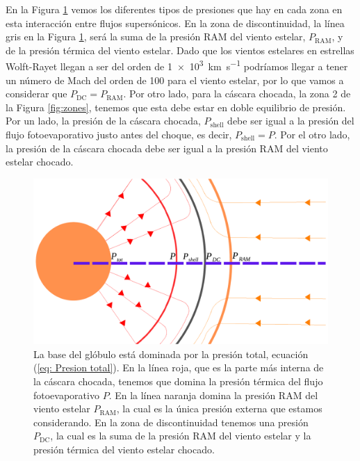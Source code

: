 \documentclass{book}
\begin{document}
En la Figura \ref{fig:zones_presiones} vemos los diferentes tipos de presiones que hay en cada zona en esta interacción entre flujos supersónicos. En la zona de discontinuidad, la línea gris en la Figura \ref{fig:zones_presiones}, será la suma de la presión RAM del viento estelar, $P_\mathrm{RAM}$, y de la presión térmica del viento estelar. Dado que los vientos estelares en estrellas Wolft-Rayet llegan a ser del orden de \SI{1e3}{km.s^{-1}} podríamos llegar a tener un número de Mach del orden de 100 para el viento estelar, por lo que vamos a considerar que $P_\mathrm{DC}=P_\mathrm{RAM}$. Por otro lado, para la cáscara chocada, la zona 2 de la Figura \ref{fig:zones}, tenemos que esta debe estar en doble equilibrio de presión. Por un lado, la presión de la cáscara chocada, $P_\mathrm{shell}$ debe ser igual a la presión del flujo fotoevaporativo justo antes del choque, es decir, $P_\mathrm{shell}=P$. Por el otro lado, la presión de la cáscara chocada debe ser igual a la presión RAM del viento estelar chocado.

\begin{figure}[htb]
    \centering    \includegraphics[width=\textwidth]{imagenes_corregidas/Arreglo 03.pdf}
    \caption{La base del glóbulo está dominada por la presión total, ecuación (\ref{eq: Presion total}). En la línea roja, que es la parte más interna de la cáscara chocada, tenemos que domina la presión térmica del flujo fotoevaporativo $P$. En la línea naranja domina la presión RAM del viento estelar $P_\mathrm{RAM}$, la cual es la única presión externa que estamos considerando. En la zona de discontinuidad tenemos una presión $P_\mathrm{DC}$, la cual es la suma de la presión RAM del viento estelar y la presión térmica del viento estelar chocado. }
    \label{fig:zones_presiones}
\end{figure}
\end{document}
